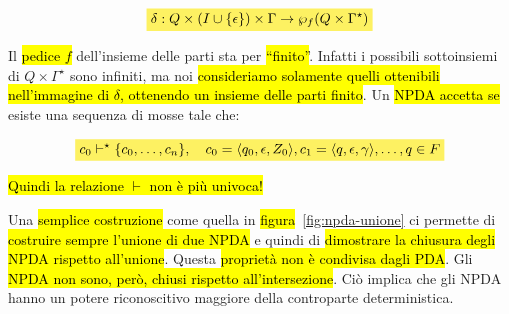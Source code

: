 \documentclass[a4paper,11pt,oneside]{article}
\theoremstyle{plain}
\theoremstyle{definition}
\theoremstyle{remark}
\newcommand{\mhl}[1]{\colorbox{hlcolor}{$\displaystyle #1$}}
\begin{document}
\begin{equation}
  \mhl{
    \delta: Q \times (I \cup \{\epsilon\}) \times \Gamma \to
      \wp_f(Q \times \Gamma^\star)
  }
\end{equation}

Il \hl{pedice $f$} dell'insieme delle parti sta per \hl{``finito''}. Infatti i possibili
sottoinsiemi di $Q \times \Gamma^\star$ sono infiniti, ma noi \hl{consideriamo
solamente quelli ottenibili nell'immagine di $\delta$, ottenendo un insieme
delle parti finito}. Un \hl{NPDA accetta se} esiste una sequenza di mosse tale che:

\begin{equation}
  \mhl{
    c_0 \vdash^\star \{c_0, \ldots, c_n \}, \quad
      c_0 = \langle q_0, \epsilon, Z_0 \rangle,
      c_1 = \langle q, \epsilon, \gamma \rangle, \ldots, q \in F
  }
\end{equation}

\hl{Quindi la relazione $\vdash$ non è più univoca!}

Una \hl{semplice costruzione} come quella in \hl{figura}~\ref{fig:npda-unione}
ci permette di \hl{costruire sempre l'unione di due NPDA} e quindi di
\hl{dimostrare la chiusura degli NPDA rispetto all'unione}. Questa \hl{proprietà
non è condivisa dagli PDA}\@. Gli \hl{NPDA non sono, però, chiusi rispetto
all'intersezione}. Ciò implica che gli NPDA hanno un potere riconoscitivo
maggiore della controparte deterministica.
\end{document}
